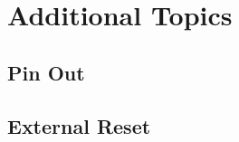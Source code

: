 \chapter{Additional Topics}
\label{AppendixAdditionalTopics}

\section{Pin Out}

\section{External Reset}


